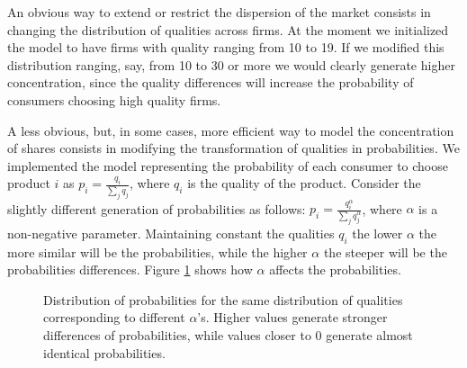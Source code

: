 \documentclass [11pt,a4paper] {book}
\begin{document}
An obvious way to extend or restrict the dispersion of the market consists in changing the distribution of qualities across firms. At the moment we initialized the model to have firms with quality ranging from 10 to 19. If we modified this distribution ranging, say, from 10 to 30 or more we would clearly generate higher concentration, since the quality differences will increase the probability of consumers choosing high quality firms.

A less obvious, but, in some cases, more efficient way to model the concentration of shares consists in modifying the transformation of qualities in probabilities. We implemented the model representing the probability of each consumer to choose product $i$ as $p_i=\frac{q_i}{\sum_j q_j}$, where $q_i$ is the quality of the product. Consider the slightly different generation of probabilities as follows: $p_i=\frac{q^\alpha_i}{\sum_j q^\alpha_j}$, where $\alpha$ is a non-negative parameter. Maintaining constant the qualities $q_i$ the lower $\alpha$ the more similar will be the probabilities, while the higher $\alpha$ the steeper will be the probabilities differences. Figure \ref{fig:prob} shows how $\alpha$ affects the probabilities. 

\begin{figure}[ht]
  \centering
  \caption{\small Distribution of probabilities for the same distribution of qualities corresponding to different $\alpha$'s. Higher values generate stronger differences of probabilities, while values closer to 0 generate almost identical probabilities.}
   \label{fig:prob}
\end{figure}
\end{document}
